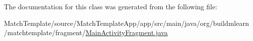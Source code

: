 The documentation for this class was generated from the following file\+:\begin{DoxyCompactItemize}
\item 
Match\+Template/source/\+Match\+Template\+App/app/src/main/java/org/buildmlearn/matchtemplate/fragment/\hyperlink{MatchTemplate_2source_2MatchTemplateApp_2app_2src_2main_2java_2org_2buildmlearn_2matchtemplate_28ba3955079e039e8d5f320826056b22b}{Main\+Activity\+Fragment.\+java}\end{DoxyCompactItemize}
